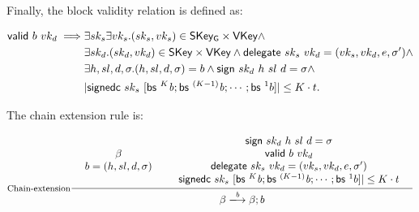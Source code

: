 \documentclass[11pt,a4paper]{article}
\newcommand{\var}[1]{\mathit{#1}}
\newcommand{\fun}[1]{\mathsf{#1}}
\newcommand{\type}[1]{\mathsf{#1}}
\newcommand{\trans}[2]{\xlongrightarrow[\textsc{#1}]{#2}}
\newcommand{\SKey}{\type{SKey}}
\newcommand{\SKeyGen}{\type{SKey_G}}
\newcommand{\VKey}{\type{VKey}}
\newcommand{\signname}{sign}
\newcommand{\signedseqname}{signedc}
\newcommand{\delegatename}{delegate}
\newcommand{\validname}{valid}
\newcommand{\predbseqname}{bs} %
\newcommand{\sign}[4]{\fun{\signname}\ #1 ~ #2 ~ #3 ~ #4}
\newcommand{\signedwindow}[2]{\fun{\signedseqname}\ #1 ~ #2}
\newcommand{\delegate}[2]{\fun{\delegatename}\ #1 ~ #2}
\newcommand{\valid}[2]{\fun{\validname} ~ #1 ~ #2}
\newcommand{\predbseq}[1]{\fun{\predbseqname} ~ #1}
\begin{document}
Finally, the block validity relation is defined as:

\begin{align}
  \label{eq:valid-block}
    \valid{b}{vk_d} \implies &
      \exists sk_s \exists vk_s. (sk_s, vk_s) \in \SKeyGen \times \VKey \wedge \\
      & \exists sk_d. (sk_d, vk_d) \in \SKey \times \VKey \wedge
      \delegate{sk_s}{vk_d} = (vk_s, vk_d, e, \sigma') \wedge \\
      & \exists h, sl, d, \sigma. (h, sl, d, \sigma) = b \wedge
        \sign{sk_d}{h}{sl}{d} = \sigma \wedge \\
      & | \signedwindow{sk_s}{[\predbseq^K\var{b}; \predbseq^{(K-1)}\var{b}; \cdots; \predbseq^1{b}]} | \leq K \cdot t.
\end{align}

The chain extension rule is:

\begin{equation}
  \label{eq:chain-extension}
  \inference[Chain-extension]
  {
    {\begin{array}{c}
       \beta \\
       b = (h, sl, d, \sigma)
    \end{array}}
    &
    {\begin{array}{c}
       \sign{sk_d}{h}{sl}{d} = \sigma \\
       \valid{b}{vk_d} \\
       \delegate{sk_s}{vk_d} = (vk_s, vk_d, e, \sigma') \\
       \signedwindow{sk_s}{[\predbseq^K\var{b}; \predbseq^{(K-1)}\var{b}; \cdots; \predbseq^1{b}]} | \leq K \cdot t
    \end{array}}
  }
  {\beta \trans{}{\var{b}} {\beta; b}}
\end{equation}
\end{document}
